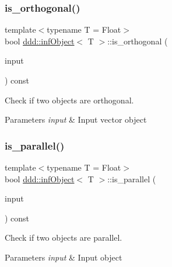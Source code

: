 \subsubsection{\texorpdfstring{is\+\_\+orthogonal()}{is\_orthogonal()}}
{\footnotesize\ttfamily template$<$typename T = Float$>$ \\
bool \hyperlink{classddd_1_1inf_object}{ddd\+::inf\+Object}$<$ T $>$\+::is\+\_\+orthogonal (\begin{DoxyParamCaption}\item[{const \hyperlink{classddd_1_1inf_object}{inf\+Object}$<$ T $>$ \&}]{input }\end{DoxyParamCaption}) const\hspace{0.3cm}{\ttfamily [inline]}}



Check if two objects are orthogonal. 


\begin{DoxyParams}{Parameters}
{\em input} & Input vector object \\
\hline
\end{DoxyParams}
\mbox{\label{classddd_1_1inf_object_abff7690f241c7d92f32e12692f7503af}} 
\subsubsection{\texorpdfstring{is\+\_\+parallel()}{is\_parallel()}}
{\footnotesize\ttfamily template$<$typename T = Float$>$ \\
bool \hyperlink{classddd_1_1inf_object}{ddd\+::inf\+Object}$<$ T $>$\+::is\+\_\+parallel (\begin{DoxyParamCaption}\item[{const \hyperlink{classddd_1_1inf_object}{inf\+Object}$<$ T $>$ \&}]{input }\end{DoxyParamCaption}) const\hspace{0.3cm}{\ttfamily [inline]}}



Check if two objects are parallel. 


\begin{DoxyParams}{Parameters}
{\em input} & Input object \\
\hline
\end{DoxyParams}
\mbox{\label{classddd_1_1inf_object_a486961bee26e144e8b5e61ada65b2c4c}} 
